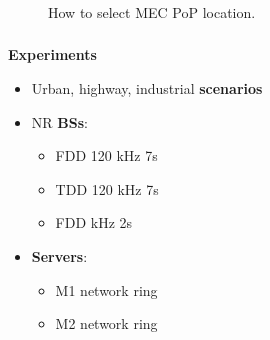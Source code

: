 \documentclass[aspectratio=169]{beamer}
\begin{document}
\begin{frame}
    \frametitle{\secname}
    \framesubtitle{\subsecname}

    \begin{figure}
        \centering
        \caption{How to select MEC PoP location.}
        \label{fig:algo-pop-location}
    \end{figure}
\end{frame}




\begin{frame}
    \frametitle{\secname}
    \framesubtitle{\subsecname}
    \textbf{Experiments}
    \begin{itemize}
        \item Urban, highway, industrial \textbf{scenarios}
        \item NR \textbf{BSs}:
            \begin{itemize}
                \item FDD 120 kHz 7s
                \item TDD 120 kHz 7s
                \item FDD  kHz 2s
            \end{itemize}
        \item \textbf{Servers}:
            \begin{itemize}
                \item M1 network ring
                \item M2 network ring
            \end{itemize}
    \end{itemize}
\end{frame}
\end{document}
